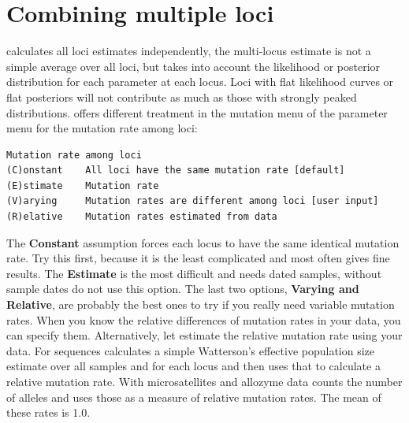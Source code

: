 \section{Combining multiple loci}
\migrate calculates all loci estimates independently, the multi-locus estimate is not a simple average over all loci, but takes into account the likelihood or posterior distribution for each parameter at each locus. Loci with flat likelihood curves or flat posteriors will not contribute as much as those with strongly peaked distributions. \migrate offers different treatment in the mutation menu of the parameter menu for the mutation rate among loci:
\begin{center}
\begin{minipage}[c]{12cm}
\begin{verbatim}
Mutation rate among loci
(C)onstant    All loci have the same mutation rate [default]
(E)stimate    Mutation rate 
(V)arying     Mutation rates are different among loci [user input]
(R)elative    Mutation rates estimated from data
\end{verbatim}
\end{minipage}
\end{center}
The {\bf Constant} assumption forces each locus to have the same identical mutation rate. Try this first, because it is the least complicated and most often gives fine results. The {\bf Estimate} is the most difficult and needs dated samples, without sample dates do not use this option.
The last two options, {\bf Varying and Relative}, are probably the best ones to try if you really need variable mutation rates. When you know the relative differences of mutation rates in your data, you can specify them. Alternatively, let \migrate estimate the relative mutation rate using your data. For sequences \migrate calculates a simple Watterson's effective population size estimate over all samples and for each locus and then uses that to calculate a relative mutation rate. With microsatellites and allozyme data \migrate counts the number of alleles and uses those as a measure of relative mutation rates. The mean of these rates is 1.0.
\newpage
